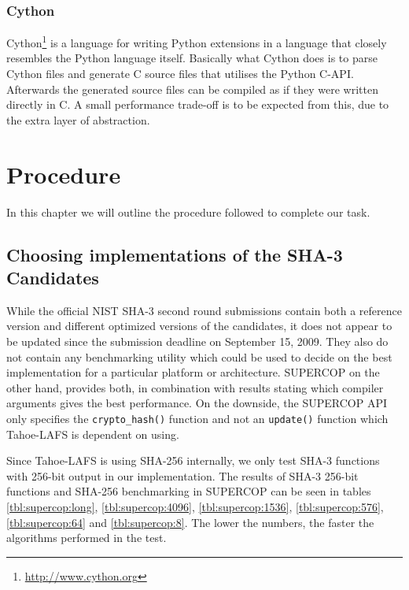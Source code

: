 \documentclass[english,12pt,a4paper]{book}
\begin{document}
\subsection{Cython}
Cython\footnote{\url{http://www.cython.org}} is a language for writing Python
extensions in a language that closely resembles the Python language itself.
Basically what Cython does is to parse Cython files and generate C source files
that utilises the Python C-API. Afterwards the generated source files can be
compiled as if they were written directly in C. A small performance trade-off is
to be expected from this, due to the extra layer of abstraction.

\chapter{Procedure}

%

In this chapter we will outline the procedure followed to complete our task.

\section{Choosing implementations of the SHA-3 Candidates}

While the official \ac{NIST} \ac{SHA}-3 second round submissions contain both
a reference version and different optimized versions of the candidates, it does not
appear to be updated since the submission deadline on September 15, 2009. They
also do not contain any benchmarking utility which could be used to decide on
the best implementation for a particular platform or architecture. \ac{SUPERCOP}
on the other hand, provides both, in combination with results stating which
compiler arguments gives the best performance. On the downside, the
\ac{SUPERCOP} \ac{API} only specifies the \texttt{crypto\_hash()} function and
not an \texttt{update()} function which Tahoe-\ac{LAFS} is dependent on using.

Since Tahoe-\ac{LAFS} is using \ac{SHA}-256 internally, we only test \ac{SHA}-3
functions with 256-bit output in our implementation. The results of \ac{SHA}-3
256-bit functions and \ac{SHA}-256 benchmarking in \ac{SUPERCOP} can be seen in
tables \ref{tbl:supercop:long}, \ref{tbl:supercop:4096},
\ref{tbl:supercop:1536}, \ref{tbl:supercop:576}, \ref{tbl:supercop:64} and
\ref{tbl:supercop:8}. The lower the numbers, the faster the algorithms
performed in the test.
\end{document}
